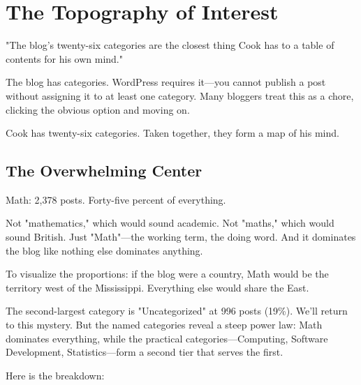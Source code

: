 \chapter{The Topography of Interest}

\epigraph{"The blog's twenty-six categories are the closest thing Cook has to a table of contents for his own mind."}{}

\bigskip

The blog has categories. WordPress requires it—you cannot publish a post without assigning it to at least one category. Many bloggers treat this as a chore, clicking the obvious option and moving on.

Cook has twenty-six categories. Taken together, they form a map of his mind.

\bigskip

\section*{The Overwhelming Center}

Math: 2,378 posts. Forty-five percent of everything.

Not "mathematics," which would sound academic. Not "maths," which would sound British. Just "Math"—the working term, the doing word. And it dominates the blog like nothing else dominates anything.

To visualize the proportions: if the blog were a country, Math would be the territory west of the Mississippi. Everything else would share the East.


The second-largest category is "Uncategorized" at 996 posts (19\%). We'll return to this mystery. But the named categories reveal a steep power law: Math dominates everything, while the practical categories—Computing, Software Development, Statistics—form a second tier that serves the first.

Here is the breakdown:

